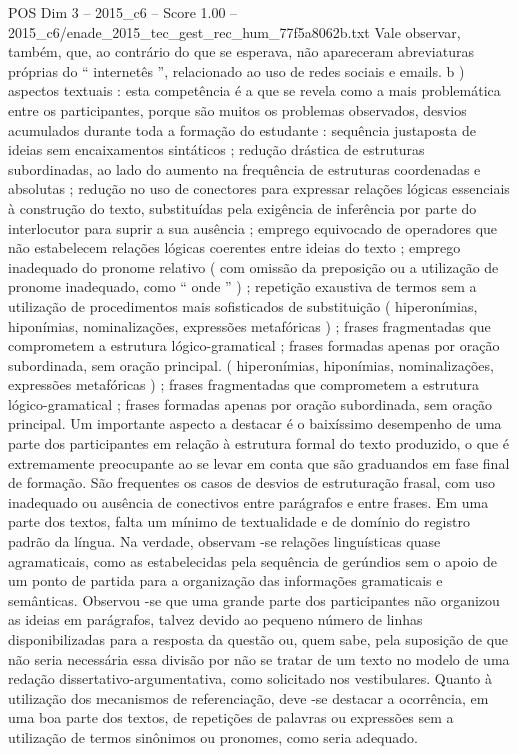 \begin{textsample}{POS Dim 3 – 2015\_c6 – Score 1.00 – 2015\_c6/enade\_2015\_tec\_gest\_rec\_hum\_77f5a8062b.txt}
Vale observar, também, que, ao contrário do que se esperava, não apareceram abreviaturas próprias do “ internetês ”, relacionado ao uso de redes sociais e emails. b ) aspectos textuais : esta competência é a que se revela como a mais problemática entre os participantes, porque são muitos os problemas observados, desvios acumulados durante toda a formação do estudante : sequência justaposta de ideias sem encaixamentos sintáticos ; redução drástica de estruturas subordinadas, ao lado do aumento na frequência de estruturas coordenadas e absolutas ; redução no uso de conectores para expressar relações lógicas essenciais à construção do texto, substituídas pela exigência de inferência por parte do interlocutor para suprir a sua ausência ; emprego equivocado de operadores que não estabelecem relações lógicas coerentes entre ideias do texto ; emprego inadequado do pronome relativo ( com omissão da preposição ou a utilização de pronome inadequado, como “ onde ” ) ; repetição exaustiva de termos sem a utilização de procedimentos mais sofisticados de substituição ( hiperonímias, hiponímias, nominalizações, expressões metafóricas ) ; frases fragmentadas que comprometem a estrutura lógico-gramatical ; frases formadas apenas por oração subordinada, sem oração principal. ( hiperonímias, hiponímias, nominalizações, expressões metafóricas ) ; frases fragmentadas que comprometem a estrutura lógico-gramatical ; frases formadas apenas por oração subordinada, sem oração principal.
Um importante aspecto a destacar é o baixíssimo desempenho de uma parte dos participantes em relação à estrutura formal do texto produzido, o que é extremamente preocupante ao se levar em conta que são graduandos em fase final de formação.
São frequentes os casos de desvios de estruturação frasal, com uso inadequado ou ausência de conectivos entre parágrafos e entre frases.
Em uma parte dos textos, falta um mínimo de textualidade e de domínio do registro padrão da língua.
Na verdade, observam -se relações linguísticas quase agramaticais, como as estabelecidas pela sequência de gerúndios sem o apoio de um ponto de partida para a organização das informações gramaticais e semânticas.
Observou -se que uma grande parte dos participantes não organizou as ideias em parágrafos, talvez devido ao pequeno número de linhas disponibilizadas para a resposta da questão ou, quem sabe, pela suposição de que não seria necessária essa divisão por não se tratar de um texto no modelo de uma redação dissertativo-argumentativa, como solicitado nos vestibulares.
Quanto à utilização dos mecanismos de referenciação, deve -se destacar a ocorrência, em uma boa parte dos textos, de repetições de palavras ou expressões sem a utilização de termos sinônimos ou pronomes, como seria adequado.

\end{textsample}
